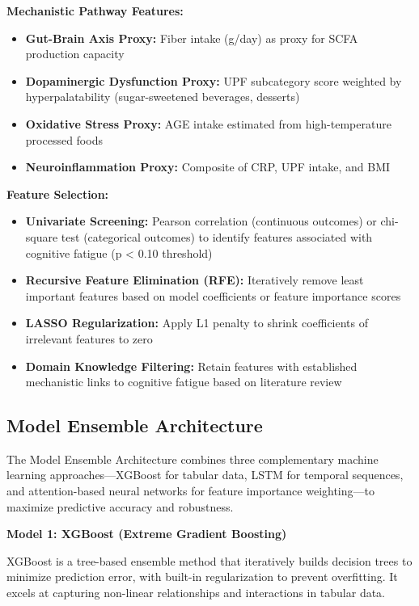 \documentclass[journal,twoside,10pt]{IEEEtran}
\begin{document}
\textbf{Mechanistic Pathway Features:}
\begin{itemize}
\item \textbf{Gut-Brain Axis Proxy:} Fiber intake (g/day) as proxy for SCFA production capacity
\item \textbf{Dopaminergic Dysfunction Proxy:} UPF subcategory score weighted by hyperpalatability (sugar-sweetened beverages, desserts)
\item \textbf{Oxidative Stress Proxy:} AGE intake estimated from high-temperature processed foods
\item \textbf{Neuroinflammation Proxy:} Composite of CRP, UPF intake, and BMI
\end{itemize}

\textbf{Feature Selection:}
\begin{itemize}
\item \textbf{Univariate Screening:} Pearson correlation (continuous outcomes) or chi-square test (categorical outcomes) to identify features associated with cognitive fatigue (p < 0.10 threshold)
\item \textbf{Recursive Feature Elimination (RFE):} Iteratively remove least important features based on model coefficients or feature importance scores
\item \textbf{LASSO Regularization:} Apply L1 penalty to shrink coefficients of irrelevant features to zero
\item \textbf{Domain Knowledge Filtering:} Retain features with established mechanistic links to cognitive fatigue based on literature review
\end{itemize}

\subsection{Model Ensemble Architecture}

The Model Ensemble Architecture combines three complementary machine learning approaches---XGBoost for tabular data, LSTM for temporal sequences, and attention-based neural networks for feature importance weighting---to maximize predictive accuracy and robustness.

\textbf{Model 1: XGBoost (Extreme Gradient Boosting)}

XGBoost is a tree-based ensemble method that iteratively builds decision trees to minimize prediction error, with built-in regularization to prevent overfitting. It excels at capturing non-linear relationships and interactions in tabular data.
\end{document}
